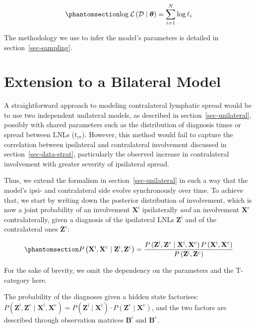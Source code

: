 \documentclass[
  sn-mathphys-num,
]{sn-jnl}
\begin{document}
\begin{equation}\phantomsection\label{eq-log-likelihood}{
\log \mathcal{L} \left( \mathcal{D} \mid \boldsymbol{\theta} \right) = \sum_{i=1}^N \log \ell_i
}\end{equation}

The methodology we use to infer the model's parameters is detailed in
section~\ref{sec-sampling}.

\section{Extension to a Bilateral Model}\label{sec-ext-to-contra}

A straightforward approach to modeling contralateral lymphatic spread
would be to use two independent unilateral models, as described in
section~\ref{sec-unilateral}, possibly with shared parameters such as
the distribution of diagnosis times or spread between LNLs (\(t_{vr}\)).
However, this method would fail to capture the correlation between
ipsilateral and contralateral involvement discussed in
section~\ref{sec-data-strat}, particularly the observed increase in
contralateral involvement with greater severity of ipsilateral spread.

Thus, we extend the formalism in section~\ref{sec-unilateral} in such a
way that the model's ipsi- and contralateral side evolve synchronously
over time. To achieve that, we start by writing down the posterior
distribution of involvement, which is now a joint probability of an
involvement \(\mathbf{X}^\text{i}\) ipsilaterally \emph{and} an
involvement \(\mathbf{X}^\text{c}\) contralaterally, given a diagnosis
of the ipsilateral LNLs \(\mathbf{Z}^\text{i}\) and of the contralateral
ones \(\mathbf{Z}^\text{c}\):

\begin{equation}\phantomsection\label{eq-bilateral-bayes}{
P \left( \mathbf{X}^\text{i}, \mathbf{X}^\text{c} \mid \mathbf{Z}^\text{i}, \mathbf{Z}^\text{c} \right) = \frac{P \left( \mathbf{Z}^\text{i}, \mathbf{Z}^\text{c} \mid \mathbf{X}^\text{i}, \mathbf{X}^\text{c} \right) P \left( \mathbf{X}^\text{i}, \mathbf{X}^\text{c} \right)}{P \left( \mathbf{Z}^\text{i}, \mathbf{Z}^\text{c} \right)}
}\end{equation}

For the sake of brevity, we omit the dependency on the parameters and
the T-category here.

The probability of the diagnoses given a hidden state factorises:
\(P \left( \mathbf{Z}^\text{i}, \mathbf{Z}^\text{c} \mid \mathbf{X}^\text{i}, \mathbf{X}^\text{c} \right) = P \left( \mathbf{Z}^\text{i} \mid \mathbf{X}^\text{i} \right) \cdot P \left( \mathbf{Z}^\text{c} \mid \mathbf{X}^\text{c} \right)\),
and the two factors are described through observation matrices
\(\mathbf{B}^\text{i}\) and \(\mathbf{B}^\text{c}\).
\end{document}
